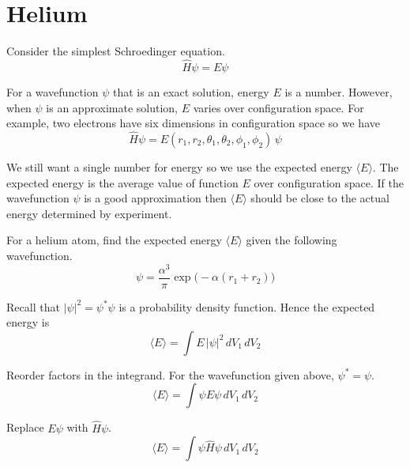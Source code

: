 

\section*{Helium}
Consider the simplest Schroedinger equation.
\begin{equation*}
\hat{H}\psi=E\psi
\end{equation*}

For a wavefunction $\psi$ that is an exact solution, energy $E$ is a number.
However, when $\psi$ is an approximate solution, $E$ varies over configuration space.
For example, two electrons have six dimensions in configuration space so we have
\begin{equation*}
\hat{H}\psi=E(r_1,r_2,\theta_1,\theta_2,\phi_1,\phi_2)\,\psi
\end{equation*}

We still want a single number for energy so we use the expected energy $\langle E\rangle$.
The expected energy is the average value of function $E$ over configuration space.
If the wavefunction $\psi$ is a good approximation
then $\langle E\rangle$ should be close to the actual energy determined by experiment.

\bigskip
For a helium atom, find the expected energy $\langle E\rangle$ given the following wavefunction.
\begin{equation*}
\psi=\frac{\alpha^3}{\pi}\exp\bigl(-\alpha (r_1+r_2)\bigr)
\end{equation*}

Recall that $|\psi|^2=\psi^*\psi$ is a probability density function.
Hence the expected energy is
\begin{equation*}
\langle E\rangle=\int E\,|\psi|^2\,dV_1\,dV_2
\end{equation*}

Reorder factors in the integrand.
For the wavefunction given above, $\psi^*=\psi$.
\begin{equation*}
\langle E\rangle=\int\psi E\psi\,dV_1\,dV_2
\end{equation*}

Replace $E\psi$ with $\hat{H}\psi$.
\begin{equation*}
\langle E\rangle=\int\psi\hat{H}\psi\,dV_1\,dV_2
\end{equation*}

